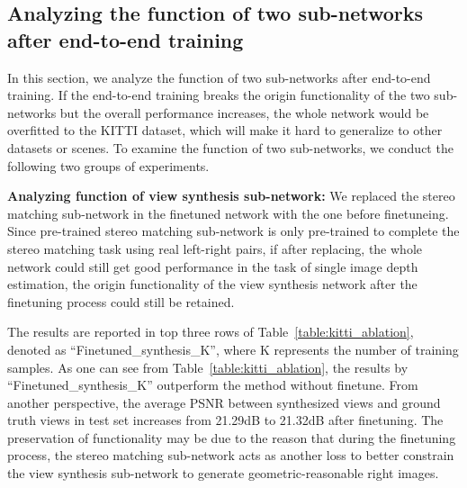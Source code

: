 \documentclass[10pt,twocolumn,letterpaper]{article}
\begin{document}
\subsection{Analyzing the function of two sub-networks after end-to-end training}
In this section, we analyze the function of two sub-networks after end-to-end training. If the end-to-end training breaks the origin functionality of the two sub-networks but the overall performance increases, the whole network would be overfitted to the KITTI dataset, which will make it hard to generalize to other datasets or scenes. To examine the function of two sub-networks, we conduct the following two groups of experiments.

\textbf{Analyzing function of view synthesis sub-network:}
We replaced the stereo matching sub-network in the finetuned network with the one before finetuneing. Since pre-trained stereo matching sub-network is only pre-trained to complete the stereo matching task using real left-right pairs, if after replacing, the whole network could still get good performance in the task of single image depth estimation, the origin functionality of the view synthesis network after the finetuning process could still be retained.

The results are reported in top three rows of Table~\ref{table:kitti_ablation}, denoted as ``Finetuned\_synthesis\_K'', where K represents the number of training samples. As one can see from Table~\ref{table:kitti_ablation}, the results by ``Finetuned\_synthesis\_K'' outperform the method without finetune. From another perspective, the average PSNR between synthesized views and ground truth views in test set increases from 21.29dB to 21.32dB after finetuning. The preservation of functionality may be due to the reason that during the finetuning process, the stereo matching sub-network acts as another loss to better constrain the view synthesis sub-network to generate geometric-reasonable right images. 
\end{document}
